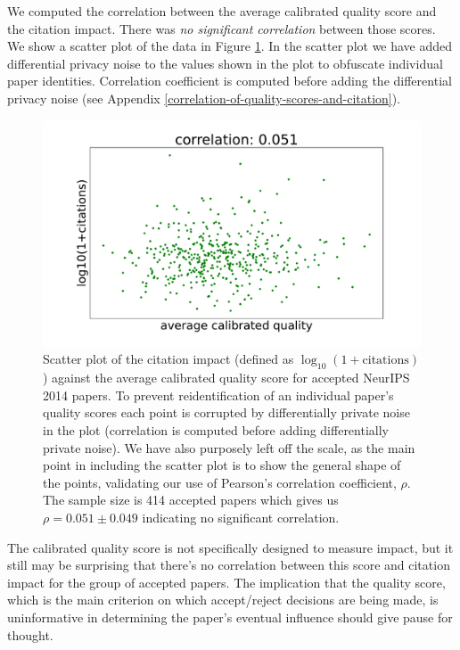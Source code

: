 \documentclass[twoside]{article}
\begin{document}
We computed the correlation between the average calibrated quality score and the citation impact. There was \emph{no significant correlation} between those scores. We show a scatter plot of the data in Figure \ref{figure-citations-vs-average-calibrated-quality-accept}. In the scatter plot we have added differential privacy noise to the values shown in the plot to obfuscate individual paper identities. Correlation coefficient is computed before adding the differential privacy noise (see Appendix \ref{correlation-of-quality-scores-and-citation}).

\begin{figure}[htb]
  \begin{center}
    \includegraphics[width=0.9\columnwidth]{diagrams/neurips/citations-vs-average-calibrated-quality-accept.pdf}
  \end{center}
  \caption{Scatter plot of the citation impact (defined as $\log_{10}(1+\text{citations})$) against the average calibrated quality score for accepted NeurIPS 2014 papers. To prevent reidentification of an individual paper's quality scores each point is corrupted by differentially private noise in the plot (correlation is computed before adding differentially private noise). We have also purposely left off the scale, as the main point in including the scatter plot is to show the general shape of the points, validating our use of Pearson's correlation coefficient, $\rho$. The sample size is 414 accepted papers which gives us $\rho = 0.051 \pm 0.049$ indicating no significant correlation.}
  \label{figure-citations-vs-average-calibrated-quality-accept}
\end{figure}

The calibrated quality score is not specifically designed to measure impact, but it still may be surprising that there's no correlation between this score and citation impact for the group of accepted papers. The implication that the quality score, which is the main criterion on which accept/reject decisions are being made, is uninformative in determining the paper's eventual influence should give pause for thought.
\end{document}
